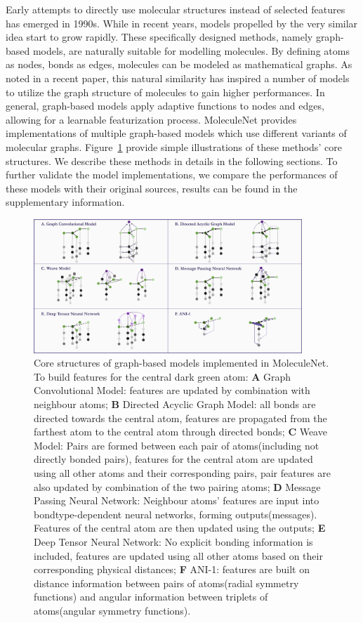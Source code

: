 Early attempts to directly use molecular structures instead of selected features has emerged in 1990s\cite{baskin1997neural, kireev1995chemnet}. While in recent years, models propelled by the very similar idea start to grow rapidly. These specifically designed methods, namely graph-based models, are naturally suitable for modelling molecules. By defining atoms as nodes, bonds as edges, molecules can be modeled as mathematical graphs. As noted in a recent paper\cite{MPNN}, this natural similarity has inspired a number of models to utilize the graph structure of molecules to gain higher performances. In general, graph-based models apply adaptive functions to nodes and edges, allowing for a learnable featurization process. MoleculeNet provides implementations of multiple graph-based models which use different variants of molecular graphs. Figure~\ref{fig:model_structure1} provide simple illustrations of these methods' core structures. We describe these methods in details in the following sections. To further validate the model implementations, we compare the performances of these models with their original sources, results can be found in the supplementary information.\dag

\begin{figure}
  \centering
  \includegraphics[width=0.9\textwidth]{Images/model_structure.png}
  \caption{Core structures of graph-based models implemented in MoleculeNet. To build features for the central dark green atom: \textbf{A} Graph Convolutional Model: features are updated by combination with neighbour atoms; \textbf{B} Directed Acyclic Graph Model: all bonds are directed towards the central atom, features are propagated from the farthest atom to the central atom through directed bonds; \textbf{C} Weave Model: Pairs are formed between each pair of atoms(including not directly bonded pairs), features for the central atom are updated using all other atoms and their corresponding pairs, pair features are also updated by combination of the two pairing atoms; \textbf{D} Message Passing Neural Network: Neighbour atoms' features are input into bondtype-dependent neural networks, forming outputs(messages). Features of the central atom are then updated using the outputs; \textbf{E} Deep Tensor Neural Network: No explicit bonding information is included, features are updated using all other atoms based on their corresponding physical distances; \textbf{F} ANI-1: features are built on distance information between pairs of atoms(radial symmetry functions) and angular information between triplets of atoms(angular symmetry functions).}
  \label{fig:model_structure1}
\end{figure}

